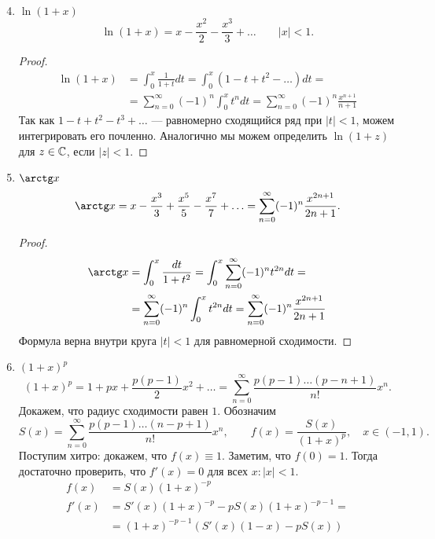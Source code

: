 \begin{enumerate}
	\setcounter{enumi}{3}
\item  $ \ln (1 + x)$ 
 \[
	 \ln(1 + x) = x - \frac{x^2}{2 } - \frac{x^3}{3} + \ldots \qquad \lvert x  \rvert < 1
 .\] 
 \begin{proof}
	\[
		\begin{aligned}
			\ln(1+x) & = \int_{0}^{x}  \frac{1}{1 + t} dt = \int_{0}^{x} (1 - t  + t^2 - \ldots ) dt =\\
					 & = \sum_{n=0}^{\infty} (-1)^{n} \int_{0}^{x} t ^{n} dt = \sum_{n=0}^{\infty} (-1)^{n} \frac{x^{n+1}}{n+1}
		\end{aligned}
	\] 
	Так как $ 1 - t + t^2 - t^3 + \ldots $ --- равномерно сходящийся ряд при $ \lvert t \rvert < 1$, можем интегрировать его почленно.
 Аналогично мы можем определить $ \ln(1+z)$ для $ z \in \mathbb{C}$, если $ \lvert z \rvert < 1$.
 \end{proof}
 \item $ \arctg x$ 
	 \[
		 \arctg x = x - \frac{x^3}{3} + \frac{x^{5}}{5} - \frac{x^{7}}{7 } + \ldots  = \sum_{n=0}^{\infty} (-1)^{n} \frac{x^{2n+1}}{2n+1}
	 .\] 
	 \begin{proof}
	     \[
	     \begin{aligned}
			 \arctg x &= \int_{0}^{x} \frac{dt}{1+t^2} = \int_{0}^{x} \sum_{n=0}^{\infty} (-1)^{n} t ^{2n} dt = \\
					  &= \sum_{n=0}^{\infty} (-1)^{n} \int_{0}^{x} t ^{2n} dt = \sum_{n=0}^{\infty} (-1) ^{n} \frac{x^{2n+1}}{2n+1}
	     \end{aligned}
	     \]
		 Формула верна внутри круга $ \lvert t \rvert < 1$ для равномерной сходимости.
	 \end{proof}
 \item $ (1+x)^{p}$
	  \[
		  (1+x)^{p} = 1 + px + \frac{p(p-1)}{2}x^2 + \ldots  = \sum_{n=0}^{\infty} \frac{p(p-1)\ldots (p-n +1)}{n!} x^{n}
	  .\] 
	  Докажем, что радиус сходимости равен $ 1$. Обозначим  \[
		  S(x) = \sum_{n=0}^{\infty} \frac{p(p-1)\ldots (n-p+1)}{n!} x^{n} , \qquad f(x) = \frac{S(x)}{(1+x)^{p}}, \quad x \in (-1, 1)
	  .\] 
	  Поступим хитро: докажем, что $ f(x) \equiv 1$. Заметим, что $ f(0) = 1$. Тогда достаточно проверить, что  $ f'(x) = 0$ для всех  $ x\colon \lvert x \rvert < 1$.
	  \[
	  \begin{aligned}
		  f(x) &= S(x) (1+x)^{-p}  \\
		  f'(x) &= S'(x) (1+x)^{-p} - p S(x) (1+x)^{-p - 1} = \\
				&= (1+x)^{-p-1} \left( S'(x) (1-x)  -p S(x) \right) 
	  \end{aligned}
\]
\end{enumerate}
